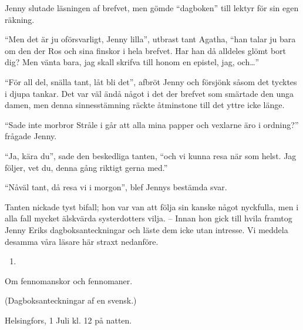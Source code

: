 Jenny slutade läsningen af brefvet, men gömde ``dagboken'' till lektyr
för sin egen räkning.

``Men det är ju oförsvarligt, Jenny lilla'', utbrast tant Agatha, ``han
talar ju bara om den der Ros och sina finskor i hela brefvet. Har han då
alldeles glömt bort dig? Men vänta bara, jag skall skrifva till honom en
epistel, jag, och\ldots{}''

``För all del, snälla tant, låt bli det'', afbröt Jenny och försjönk
såsom det tycktes i djupa tankar. Det var väl ändå något i det der
brefvet som smärtade den unga damen, men denna sinnesstämning räckte
åtminstone till det yttre icke länge.

``Sade inte morbror Stråle i går att alla mina papper och vexlarne äro i
ordning?'' frågade Jenny.

``Ja, kära du'', sade den beskedliga tanten, ``och vi kunna resa när som
helst. Jag följer, vet du, denna gång riktigt gerna med.''

``Nåväl tant, då resa vi i morgon'', blef Jennys bestämda svar.

Tanten nickade tyst bifall; hon var van att följa sin kanske något
nyckfulla, men i alla fall mycket älskvärda systerdotters vilja. --
Innan hon gick till hvila framtog Jenny Eriks dagboksanteckningar och
läste dem icke utan intresse. Vi meddela desamma våra läsare här straxt
nedanföre.

\begin{enumerate}
\def\labelenumi{\arabic{enumi}.}
\setcounter{enumi}{6}
\tightlist
\item
\end{enumerate}

Om fennomanskor och fennomaner.

(Dagboksanteckningar af en svensk.)

Helsingfors, 1 Juli kl. 12 på natten.

